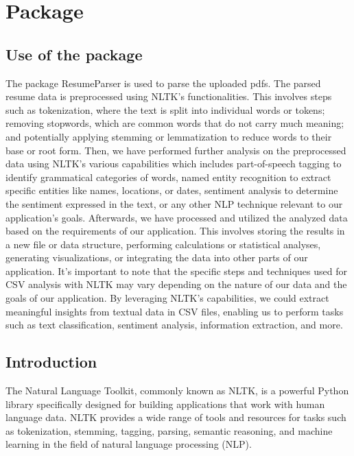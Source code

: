 %
%
%


\chapter{Package }

\section{Use of the package}

The  package ResumeParser is used to parse the uploaded pdfs. The parsed resume data is preprocessed  using NLTK's functionalities. This involves steps such as tokenization, where the text is split into individual words or tokens; removing stopwords, which are common words that do not carry much meaning; and potentially applying stemming or lemmatization to reduce words to their base or root form. Then, we have performed further analysis on the preprocessed data using NLTK's various capabilities which includes part-of-speech tagging to identify grammatical categories of words, named entity recognition to extract specific entities like names, locations, or dates, sentiment analysis to determine the sentiment expressed in the text, or any other NLP technique relevant to our application's goals. Afterwards, we  have processed and utilized the analyzed data based on the requirements of our application. This  involves storing the results in a new file or data structure, performing calculations or statistical analyses, generating visualizations, or integrating the data into other parts of our application. It's important to note that the specific steps and techniques used for CSV analysis with NLTK may vary depending on the nature of our data and the goals of our application. By leveraging NLTK's capabilities, we could extract meaningful insights from textual data in CSV files, enabling us to perform tasks such as text classification, sentiment analysis, information extraction, and more.

\section{Introduction}

The Natural Language Toolkit, commonly known as NLTK, is a powerful Python library specifically designed for building applications that work with human language data. NLTK provides a wide range of tools and resources for tasks such as tokenization, stemming, tagging, parsing, semantic reasoning, and machine learning in the field of natural language processing (NLP).

